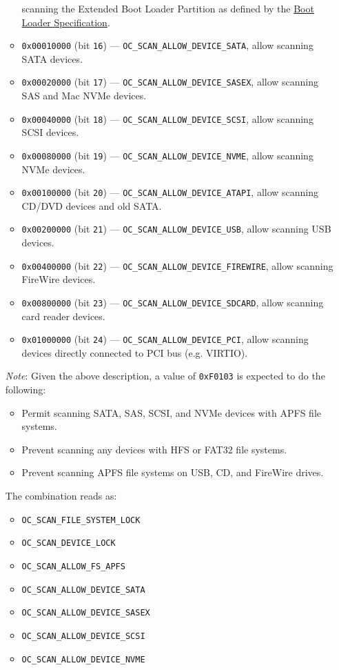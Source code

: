 \documentclass[]{article}
\providecommand{\tightlist}{%
  \setlength{\itemsep}{0pt}\setlength{\parskip}{0pt}}
\begin{document}
\begin{enumerate}
\begin{itemize}
    scanning the Extended Boot Loader Partition as defined by the
    \href{https://systemd.io/BOOT\_LOADER\_SPECIFICATION/}{Boot Loader Specification}.
    \item \texttt{0x00010000} (bit \texttt{16}) --- \texttt{OC\_SCAN\_ALLOW\_DEVICE\_SATA}, allow
    scanning SATA devices.
    \item \texttt{0x00020000} (bit \texttt{17}) --- \texttt{OC\_SCAN\_ALLOW\_DEVICE\_SASEX}, allow
    scanning SAS and Mac NVMe devices.
    \item \texttt{0x00040000} (bit \texttt{18}) --- \texttt{OC\_SCAN\_ALLOW\_DEVICE\_SCSI}, allow
    scanning SCSI devices.
    \item \texttt{0x00080000} (bit \texttt{19}) --- \texttt{OC\_SCAN\_ALLOW\_DEVICE\_NVME}, allow
    scanning NVMe devices.
    \item \texttt{0x00100000} (bit \texttt{20}) --- \texttt{OC\_SCAN\_ALLOW\_DEVICE\_ATAPI}, allow
    scanning CD/DVD devices and old SATA.
    \item \texttt{0x00200000} (bit \texttt{21}) --- \texttt{OC\_SCAN\_ALLOW\_DEVICE\_USB}, allow
    scanning USB devices.
    \item \texttt{0x00400000} (bit \texttt{22}) --- \texttt{OC\_SCAN\_ALLOW\_DEVICE\_FIREWIRE}, allow
    scanning FireWire devices.
    \item \texttt{0x00800000} (bit \texttt{23}) --- \texttt{OC\_SCAN\_ALLOW\_DEVICE\_SDCARD}, allow
    scanning card reader devices.
    \item \texttt{0x01000000} (bit \texttt{24}) --- \texttt{OC\_SCAN\_ALLOW\_DEVICE\_PCI}, allow
    scanning devices directly connected to PCI bus (e.g. VIRTIO).
  \end{itemize}

  \emph{Note}: Given the above description, a value of \texttt{0xF0103} is expected to do the following:

  \begin{itemize}
  \tightlist
  \item Permit scanning SATA, SAS, SCSI, and NVMe devices with APFS file systems.
  \item Prevent scanning any devices with HFS or FAT32 file systems.
  \item Prevent scanning APFS file systems on USB, CD, and FireWire drives.
  \end{itemize}

  The combination reads as:
  \begin{itemize}
  \tightlist
  \item \texttt{OC\_SCAN\_FILE\_SYSTEM\_LOCK}
  \item \texttt{OC\_SCAN\_DEVICE\_LOCK}
  \item \texttt{OC\_SCAN\_ALLOW\_FS\_APFS}
  \item \texttt{OC\_SCAN\_ALLOW\_DEVICE\_SATA}
  \item \texttt{OC\_SCAN\_ALLOW\_DEVICE\_SASEX}
  \item \texttt{OC\_SCAN\_ALLOW\_DEVICE\_SCSI}
  \item \texttt{OC\_SCAN\_ALLOW\_DEVICE\_NVME}
  \end{itemize}


\end{enumerate}
\end{document}
